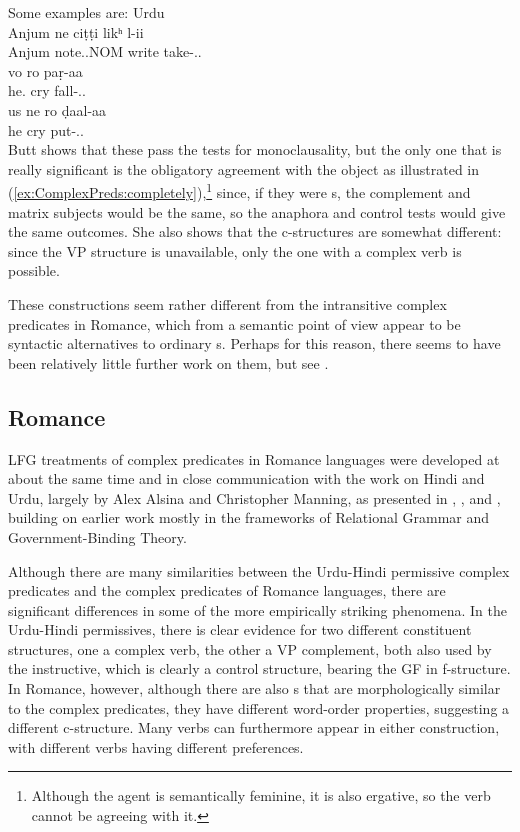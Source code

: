 \documentclass[output=paper,hidelinks]{langscibook}
\begin{document}
Some examples are:
\ea Urdu\\
\ea\label{ex:ComplexPreds:completely}
\gll Anjum ne ciṭṭi likʰ l-ii\\
Anjum {\ERG} note.{\F.NOM} write take-{\PRF.\F.\SG}\\
\citep[93]{Butt1995}
\ex
\gll vo ro paṛ-aa\\
he.{\NOM} cry fall-{\PRF.\M.\SG}\\
\citep[109]{Butt1995}
\ex
\gll us ne ro ḍaal-aa\\
he {\ERG} cry put-{\PRF.\M.\SG}\\
\citep[109]{Butt1995}
\z\z 
Butt shows that these pass the tests for monoclausality, but the only one that
is really significant is the obligatory agreement with the object as illustrated
in (\ref{ex:ComplexPreds:completely}),\footnote
 {Although the agent is semantically feminine, it is also ergative, so the verb
 cannot be agreeing with it.}
since, if they were {\XCOMP}s, the complement and matrix subjects would
be the same, so the anaphora and control tests would give the same outcomes.  She
also shows that the c-structures are somewhat different: since the VP structure is
unavailable, only the one with a complex verb is possible. 

These constructions seem rather different from the intransitive complex predicates
in Romance, which from a semantic point of view appear to be syntactic alternatives
to ordinary {\XCOMP}s.  Perhaps for this reason, there seems to have been relatively
little further work on them, but see \citet{Butt2010}.

\subsection{Romance}
LFG treatments of complex predicates in Romance languages were
developed at about the same time and in close communication with the
work on Hindi and Urdu, largely by Alex Alsina and Christopher
Manning, as presented in
\citet{Alsina:PhD,alsina1996the-role,Alsina1997}, 
\citet{Manning1992,Manning1996rcp}, and \citet{AndrewsManning1993,AndrewsManning1999},
building on earlier work mostly in the frameworks of Relational
Grammar and Government-Binding Theory.

Although there are many similarities between the Urdu-Hindi permissive complex predicates
and the complex predicates of Romance languages, there are significant differences in some of the more empirically
striking phenomena.  In the Urdu-Hindi permissives, there is clear evidence for
two different constituent structures, one a complex verb, the other a VP complement,
both also used by the instructive, which is clearly a control structure, bearing the {\XCOMP}
GF in f-structure.  In Romance, however, although there are also {\XCOMP}s
that are morphologically similar to the complex predicates, they have different word-order
properties, suggesting a different c-structure.  Many verbs can furthermore appear in
either construction, with different verbs having different preferences.
\end{document}
